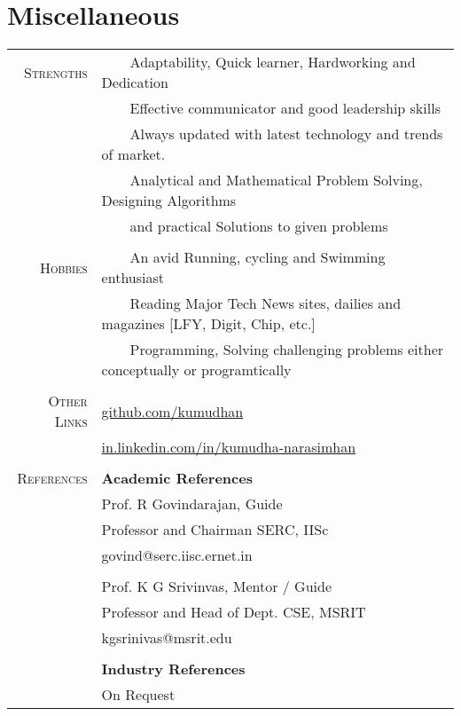\documentclass[a4paper,10pt]{article} %
\newcommand{\tabitem}{~~\llap{\textbullet}~~}
\begin{document}


\section{Miscellaneous}
\begin{tabular}{rl}
\textsc{Strengths} & \tabitem Adaptability, Quick learner, Hardworking and Dedication\\
& \tabitem Effective communicator and good leadership skills \\
& \tabitem Always updated with latest technology and trends of market.\\
& \tabitem Analytical and Mathematical Problem Solving, Designing Algorithms \\
& ~~~~and practical Solutions to given problems \\
& \\
\textsc{Hobbies} & \tabitem An avid Running, cycling and Swimming enthusiast\\
& \tabitem Reading Major Tech News sites, dailies and magazines [LFY, Digit, Chip, etc.] \\
& \tabitem Programming, Solving challenging problems either conceptually or programtically \\
& \\
\textsc{Other Links} & \href{https://github.com/kumudhan}{github.com/kumudhan} \\
& \href{http://in.linkedin.com/in/kumudha-narasimhan}{in.linkedin.com/in/kumudha-narasimhan}\\
&\\
\textsc{References} & \textbf{Academic References} \\
& Prof. R Govindarajan, Guide \\
& Professor and Chairman SERC, IISc\\
& govind@serc.iisc.ernet.in \\
&\\
& Prof. K G Srivinvas, Mentor / Guide  \\
& Professor and Head of Dept. CSE, MSRIT \\
& kgsrinivas@msrit.edu \\
&\\

& \textbf{Industry References} \\
& On Request \\
\end{tabular}
\end{document}
